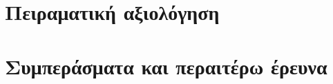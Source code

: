\section{Πειραματική αξιολόγηση}
  \label{section:02_01_04}
  

\section{Συμπεράσματα και περαιτέρω έρευνα}
  \label{section:02_01_05}
  
